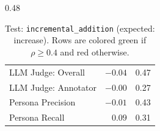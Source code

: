 \begin{table}[htbp]
\begin{subtable}[t]{0.48\textwidth}
\begin{tabular}{lrr}
\rowcolor{matchFalse} LLM Judge: Overall                    &  $-0.04$ &  0.47 \\
\rowcolor{matchFalse} LLM Judge: Annotator        &  $-0.00$ &  0.27 \\
\rowcolor{matchFalse} Persona Precision                     &  $-0.01$ &  0.43 \\
\rowcolor{matchFalse} Persona Recall                        &   $0.09$ &  0.31 \\
\bottomrule
\end{tabular}
\caption{LLM metrics}
\end{subtable}
\caption[Test: \texttt{incremental\_addition} (expected: increase).]{Test: \texttt{incremental\_addition} (expected: increase). Rows are colored green if $\rho\geq0.4$ and red otherwise.}
\label{tab:incremental_addition}
\end{table}



